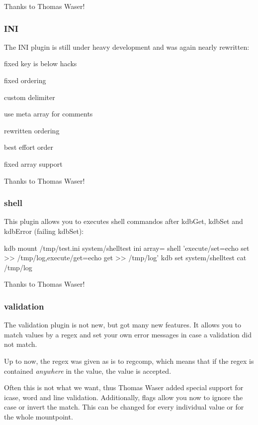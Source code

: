 Thanks to Thomas Waser!

\subsubsection*{I\+N\+I}

The I\+N\+I plugin is still under heavy development and was again nearly rewritten\+:


\begin{DoxyItemize}
\item fixed key is below hacks
\item fixed ordering
\item custom delimiter
\item use meta array for comments
\item rewritten ordering
\item best effort order
\item fixed array support
\end{DoxyItemize}

Thanks to Thomas Waser!

\subsubsection*{shell}

This plugin allows you to executes shell commandos after kdb\+Get, kdb\+Set and kdb\+Error (failing kdb\+Set)\+: \begin{DoxyVerb}kdb mount /tmp/test.ini system/shelltest ini array= shell 'execute/set=echo set >> /tmp/log,execute/get=echo get >> /tmp/log'
kdb set system/shelltest
cat /tmp/log
\end{DoxyVerb}


Thanks to Thomas Waser!

\subsubsection*{validation}

The validation plugin is not new, but got many new features. It allows you to match values by a regex and set your own error messages in case a validation did not match.

Up to now, the regex was given as is to regcomp, which means that if the regex is contained {\itshape anywhere} in the value, the value is accepted.

Often this is not what we want, thus Thomas Waser added special support for icase, word and line validation. Additionally, flags allow you now to ignore the case or invert the match. This can be changed for every individual value or for the whole mountpoint.

